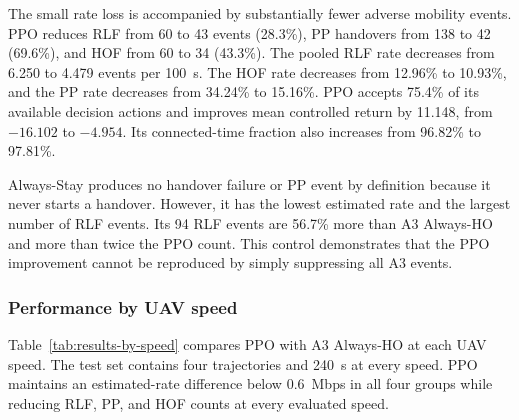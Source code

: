 The small rate loss is accompanied by substantially fewer adverse mobility
events. PPO reduces RLF from 60 to 43 events (28.3\%), PP handovers from 138 to
42 (69.6\%), and HOF from 60 to 34 (43.3\%). The pooled RLF rate decreases from
6.250 to 4.479 events per 100~s. The HOF rate decreases from 12.96\% to 10.93\%,
and the PP rate decreases from 34.24\% to 15.16\%. PPO accepts 75.4\% of its
available decision actions and improves mean controlled return by 11.148,
from $-16.102$ to $-4.954$. Its connected-time fraction also increases from
96.82\% to 97.81\%.

\begin{table}[t]
\centering
\caption{Aggregate results on the 16 held-out UAV trajectories.}
\label{tab:aggregate-results}
\end{table}

Always-Stay produces no handover failure or PP event by definition because it
never starts a handover. However, it has the lowest estimated rate and the
largest number of RLF events. Its 94 RLF events are 56.7\% more than A3
Always-HO and more than twice the PPO count. This control demonstrates that the
PPO improvement cannot be reproduced by simply suppressing all A3 events.

\subsubsection{Performance by UAV speed}

Table~\ref{tab:results-by-speed} compares PPO with A3 Always-HO at each UAV
speed. The test set contains four trajectories and 240~s at every speed. PPO
maintains an estimated-rate difference below 0.6~Mbps in all four groups while
reducing RLF, PP, and HOF counts at every evaluated speed.

